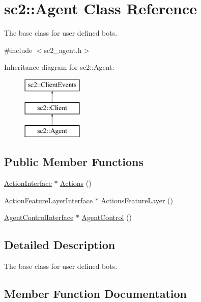 \hypertarget{classsc2_1_1_agent}{}\section{sc2\+:\+:Agent Class Reference}
\label{classsc2_1_1_agent}


The base class for user defined bots.  




{\ttfamily \#include $<$sc2\+\_\+agent.\+h$>$}

Inheritance diagram for sc2\+:\+:Agent\+:\begin{figure}[H]
\begin{center}
\leavevmode
\includegraphics[height=3.000000cm]{classsc2_1_1_agent}
\end{center}
\end{figure}
\subsection*{Public Member Functions}
\begin{DoxyCompactItemize}
\item 
\hyperlink{classsc2_1_1_action_interface}{Action\+Interface} $\ast$ \hyperlink{classsc2_1_1_agent_ac0725513a2164c76857a7d2615a31264}{Actions} ()
\item 
\hyperlink{classsc2_1_1_action_feature_layer_interface}{Action\+Feature\+Layer\+Interface} $\ast$ \hyperlink{classsc2_1_1_agent_a0e267c48e4e41e37dc14185113493cc4}{Actions\+Feature\+Layer} ()
\item 
\hyperlink{classsc2_1_1_agent_control_interface}{Agent\+Control\+Interface} $\ast$ \hyperlink{classsc2_1_1_agent_ad47b7a7383489567360ce1697d5e1675}{Agent\+Control} ()
\end{DoxyCompactItemize}


\subsection{Detailed Description}
The base class for user defined bots. 

\subsection{Member Function Documentation}
\mbox{\label{classsc2_1_1_agent_ac0725513a2164c76857a7d2615a31264}} 
